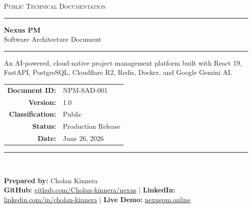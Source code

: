 \begin{titlepage}
    \centering
    \thispagestyle{empty} %
    
    \vspace*{2.5cm}
    
    {\scshape\color{muted}\footnotesize Public Technical Documentation} \\
    \vspace{0.4cm}
    \strut\hfill\rule{\textwidth}{0.75pt}\hfill\strut
    
    \vspace{2.5cm}
    
    {\fontsize{38}{44}\bfseries\color{primary} Nexus PM} \\[0.5cm]
    {\fontsize{18}{22}\mdseries\color{secondary} Software Architecture Document} \\
    
    \vspace{1.5cm}
    
    \strut\hfill\rule{0.2\textwidth}{2pt}\hfill\strut
    
    \vspace{1.5cm}
    
    \begin{minipage}{0.75\textwidth}
        \centering\color{muted}\fontsize{11}{16}\selectfont
        An AI-powered, cloud-native project management platform built with React 19, FastAPI, PostgreSQL, Cloudflare R2, Redis, Docker, and Google Gemini AI.
    \end{minipage}
    
    \vfill
    
    {\fontsize{10}{16}\selectfont\color{primary}
    \begin{tabular}{r l}
        \textbf{Document ID:} & NPM-SAD-001 \\
        \textbf{Version:} & 1.0 \\
        \textbf{Classification:} & Public \\
        \textbf{Status:} & Production Release \\
        \textbf{Date:} & June 26, 2026 \\
    \end{tabular}
    }
    
    \vspace{2.5cm}
    
    \strut\hfill\rule{\textwidth}{0.75pt}\hfill\strut \\
    \vspace{0.4cm}
    
    {\fontsize{9}{13}\selectfont\color{muted}
    \textbf{Prepared by:} Cholan Kinnera \\[0.1cm]
    \textbf{GitHub:} \href{https://github.com/Cholan-kinnera/nexus}{github.com/Cholan-kinnera/nexus} \quad | \quad 
    \textbf{LinkedIn:} \href{https://linkedin.com/in/cholan-kinnera}{linkedin.com/in/cholan-kinnera} \quad | \quad 
    \textbf{Live Demo:} \href{https://nexuspm.online}{nexuspm.online}
    }
    
\end{titlepage}
